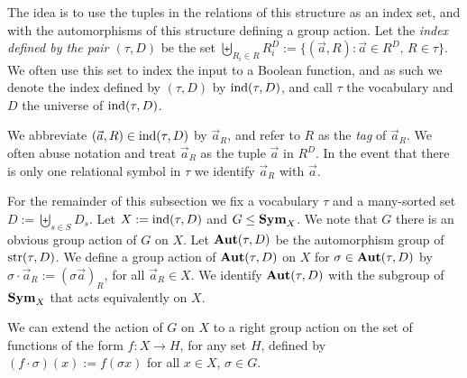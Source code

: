 \documentclass[../paper.tex]{subfiles}
\begin{document}
The idea is to use the tuples in the relations of this structure as an index
set, and with the automorphisms of this structure defining a group action. Let
the \emph{index defined by the pair $(\tau, D)$} be the set $\biguplus_{R_i\in
  R} R^{D}_i := \{ (\vec{a}, R) : \vec{a} \in R^{D}, \, R \in \tau \} $. We
often use this set to index the input to a Boolean function, and as such we
denote the index defined by $(\tau, D)$ by $\text{\upshape ind}(\tau, D)$, and call $\tau$ the
vocabulary and $D$ the universe of $\text{\upshape ind}(\tau, D)$.

We abbreviate $(\vec{a}, R) \in \text{\upshape ind}(\tau, D)$ by $\vec{a}_R$, and refer to $R$
as the \emph{tag} of $\vec{a}_R$. We often abuse notation and treat $\vec{a}_R$
as the tuple $\vec{a}$ in $R^D$. In the event that there is only one relational
symbol in $\tau$ we identify $\vec{a}_R$ with $\vec{a}$.



For the remainder of this subsection we fix a vocabulary $\tau$ and a
many-sorted set $D := \biguplus_{s \in S} D_{s}$. Let $X := \text{\upshape ind} (\tau, D)$ and
$G \leq \text{\textbf{Sym}}_{X}$. We note that $G$ there is an obvious group action of $G$ on
$X$. Let $\text{\textbf{Aut}} (\tau, D)$ be the automorphism group of $\text{str}(\tau, D)$. We
define a group action of $\text{\textbf{Aut}} (\tau, D)$ on $X$ for $\sigma \in \text{\textbf{Aut}}(\tau, D)$
by $\sigma \cdot \vec{a}_R := (\sigma \vec{a})_R$, for all $\vec{a}_R \in X$. We
identify $\text{\textbf{Aut}}(\tau, D)$ with the subgroup of $\text{\textbf{Sym}}_X$ that acts equivalently on
$X$.

We can extend the action of $G$ on $X$ to a right group action on the set of
functions of the form $f: X \rightarrow H$, for any set $H$, defined by $(f \cdot
\sigma)(x) := f(\sigma x)$ for all $x \in X$, $\sigma \in G$.




\end{document}
